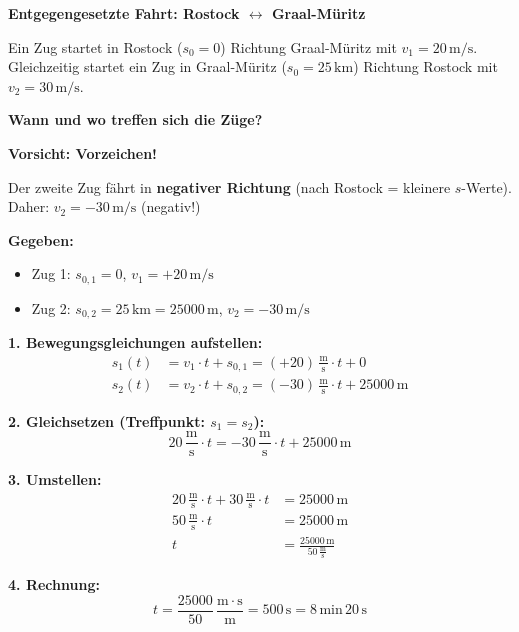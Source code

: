\documentclass[11pt,a4paper]{article}
\begin{document}
\begin{beispiel}
\textbf{Entgegengesetzte Fahrt: Rostock $\leftrightarrow$ Graal-Müritz}

Ein Zug startet in Rostock ($s_0 = 0$) Richtung Graal-Müritz mit $v_1 = 20\,\mathrm{m/s}$.\\
Gleichzeitig startet ein Zug in Graal-Müritz ($s_0 = 25\,\mathrm{km}$) Richtung Rostock mit $v_2 = 30\,\mathrm{m/s}$.

\textbf{Wann und wo treffen sich die Züge?}

\begin{warnung}
\textbf{Vorsicht: Vorzeichen!}

Der zweite Zug fährt in \textbf{negativer Richtung} (nach Rostock = kleinere $s$-Werte).\\
Daher: $v_2 = -30\,\mathrm{m/s}$ (negativ!)
\end{warnung}

\textbf{Gegeben:}
\begin{itemize}[itemsep=1pt]
\item Zug 1: $s_{0,1} = 0$, \quad $v_1 = +20\,\mathrm{m/s}$
\item Zug 2: $s_{0,2} = 25\,\mathrm{km} = 25000\,\mathrm{m}$, \quad $v_2 = -30\,\mathrm{m/s}$
\end{itemize}

\textbf{1. Bewegungsgleichungen aufstellen:}
\begin{align*}
s_1(t) &= v_1 \cdot t + s_{0,1} = (+20)\,\frac{\mathrm{m}}{\mathrm{s}} \cdot t + 0 \\[0.3em]
s_2(t) &= v_2 \cdot t + s_{0,2} = (-30)\,\frac{\mathrm{m}}{\mathrm{s}} \cdot t + 25000\,\mathrm{m}
\end{align*}

\textbf{2. Gleichsetzen (Treffpunkt: $s_1 = s_2$):}
\[
20\,\frac{\mathrm{m}}{\mathrm{s}} \cdot t = -30\,\frac{\mathrm{m}}{\mathrm{s}} \cdot t + 25000\,\mathrm{m}
\]

\textbf{3. Umstellen:}
\begin{align*}
20\,\frac{\mathrm{m}}{\mathrm{s}} \cdot t + 30\,\frac{\mathrm{m}}{\mathrm{s}} \cdot t &= 25000\,\mathrm{m} \\[0.3em]
50\,\frac{\mathrm{m}}{\mathrm{s}} \cdot t &= 25000\,\mathrm{m} \\[0.3em]
t &= \frac{25000\,\mathrm{m}}{50\,\frac{\mathrm{m}}{\mathrm{s}}}
\end{align*}

\textbf{4. Rechnung:}
\[
t = \frac{25000}{50}\,\frac{\mathrm{m} \cdot \mathrm{s}}{\mathrm{m}} = 500\,\mathrm{s} = 8\,\mathrm{min}\,20\,\mathrm{s}
\]


\end{beispiel}
\end{document}
